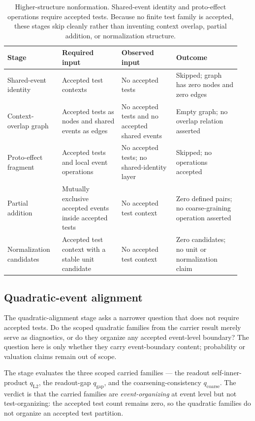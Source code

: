 \documentclass[11pt]{article}
\theoremstyle{definition}
\begin{document}
\begin{table}[t]
\centering
\small
\setlength{\tabcolsep}{4pt}
\begin{tabular}{p{0.22\linewidth}p{0.24\linewidth}p{0.22\linewidth}p{0.26\linewidth}}
\hline
\textbf{Stage} & \textbf{Required input} & \textbf{Observed input} & \textbf{Outcome} \\
\hline
Shared-event identity
&
Accepted test contexts
&
No accepted tests
&
Skipped; graph has zero nodes and zero edges
\\[0.4em]
Context-overlap graph
&
Accepted tests as nodes and shared events as edges
&
No accepted tests and no accepted shared events
&
Empty graph; no overlap relation asserted
\\[0.4em]
Proto-effect fragment
&
Accepted tests and local event operations
&
No accepted tests; no shared-identity layer
&
Skipped; no operations accepted
\\[0.4em]
Partial addition
&
Mutually exclusive accepted events inside accepted tests
&
No accepted test context
&
Zero defined pairs; no coarse-graining operation asserted
\\[0.4em]
Normalization candidates
&
Accepted test context with a stable unit candidate
&
No accepted test context
&
Zero candidates; no unit or normalization claim
\\
\hline
\end{tabular}
\caption{Higher-structure nonformation. Shared-event identity and proto-effect operations require accepted tests. Because no finite test family is accepted, these stages skip cleanly rather than inventing context overlap, partial addition, or normalization structure.}
\label{tab:higher-structure-nonformation}
\end{table}

\subsection{Quadratic-event alignment}
\label{sec:quadratic-alignment}

The quadratic-alignment stage asks a narrower question that does not require accepted tests. Do the scoped quadratic families from the carrier result merely serve as diagnostics, or do they organize any accepted event-level boundary? The question here is only whether they carry event-boundary content; probability or valuation claims remain out of scope.

The stage evaluates the three scoped carried families — the readout self-inner-product $q_{\mathrm{L2}}$, the readout-gap $q_{\mathrm{gap}}$, and the coarsening-consistency $q_{\mathrm{coarse}}$. The verdict is that the carried families are \emph{event-organizing} at event level but not test-organizing: the accepted test count remains zero, so the quadratic families do not organize an accepted test partition.
\end{document}
